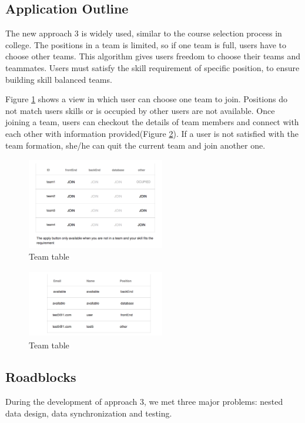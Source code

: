 \documentclass[conference]{IEEEtran}
\begin{document}
\subsection{Application Outline}
The new approach 3 is widely used, similar to the course selection process in college. The positions in a team is limited, so if one team is full, users have to choose other teams. This algorithm gives users freedom to choose their teams and teammates. Users must satisfy the skill requirement of specific position, to ensure building skill balanced teams.

Figure \ref{teams} shows a view in which user can choose one team to join. Positions do not match users skills or is occupied by other users are not available. Once joining a team, users can checkout the details of team members and connect with each other with information provided(Figure \ref{team_info}). If a user is not satisfied with the team formation, she/he can quit the current team and join another one.

\begin{figure}[H]
  \centering
  \includegraphics[width=6cm,height=4cm]{image/app3-teams.png}
  \caption{Team table}
  \label{teams}
\end{figure}
\begin{figure}[H]
  \centering
  \includegraphics[width=6cm,height=3cm]{image/app3-teaminfo.png}
  \caption{Team table}
  \label{team_info}
\end{figure}

\subsection{Roadblocks}
During the development of approach 3, we met three major problems: nested data design, data synchronization and testing.
\end{document}
